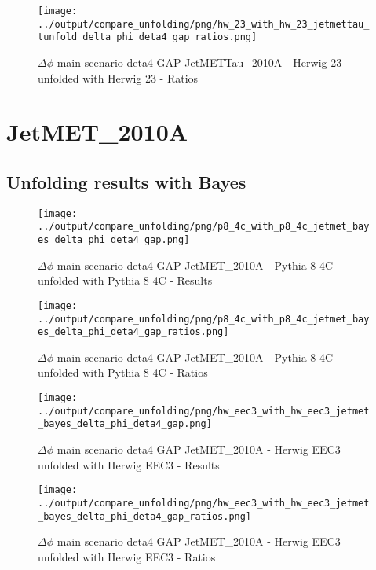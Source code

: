 \documentclass[11pt]{book}
\begin{document}
\begin{figure}[ht]
\centering
\texttt{[image: ../output/compare\_unfolding/png/hw\_23\_with\_hw\_23\_jetmettau\_tunfold\_delta\_phi\_deta4\_gap\_ratios.png]}
\caption{$\Delta\phi$ main scenario deta4 GAP JetMETTau\_2010A - Herwig 23 unfolded with Herwig 23 - Ratios}
\label{hw_23_hw_23_jetmettau_tunfold_delta_phi_deta4_gap_b}
\end{figure}


\section{JetMET\_2010A}
\subsection{Unfolding results with Bayes}

\begin{figure}[ht]
\centering
\texttt{[image: ../output/compare\_unfolding/png/p8\_4c\_with\_p8\_4c\_jetmet\_bayes\_delta\_phi\_deta4\_gap.png]}
\caption{$\Delta\phi$ main scenario deta4 GAP JetMET\_2010A - Pythia 8 4C unfolded with Pythia 8 4C - Results}
\label{p8_p8_jetmet_bayes_delta_phi_deta4_gap_a}
\end{figure}

\begin{figure}[ht]
\centering
\texttt{[image: ../output/compare\_unfolding/png/p8\_4c\_with\_p8\_4c\_jetmet\_bayes\_delta\_phi\_deta4\_gap\_ratios.png]}
\caption{$\Delta\phi$ main scenario deta4 GAP JetMET\_2010A - Pythia 8 4C unfolded with Pythia 8 4C - Ratios}
\label{p8_p8_jetmet_bayes_delta_phi_deta4_gap_b}
\end{figure}

\begin{figure}[ht]
\centering
\texttt{[image: ../output/compare\_unfolding/png/hw\_eec3\_with\_hw\_eec3\_jetmet\_bayes\_delta\_phi\_deta4\_gap.png]}
\caption{$\Delta\phi$ main scenario deta4 GAP JetMET\_2010A - Herwig EEC3 unfolded with Herwig EEC3 - Results}
\label{hw_eec3_hw_eec3_jetmet_bayes_delta_phi_deta4_gap_a}
\end{figure}

\begin{figure}[ht]
\centering
\texttt{[image: ../output/compare\_unfolding/png/hw\_eec3\_with\_hw\_eec3\_jetmet\_bayes\_delta\_phi\_deta4\_gap\_ratios.png]}
\caption{$\Delta\phi$ main scenario deta4 GAP JetMET\_2010A - Herwig EEC3 unfolded with Herwig EEC3 - Ratios}
\label{hw_eec3_hw_eec3_jetmet_bayes_delta_phi_deta4_gap_b}
\end{figure}
\end{document}

